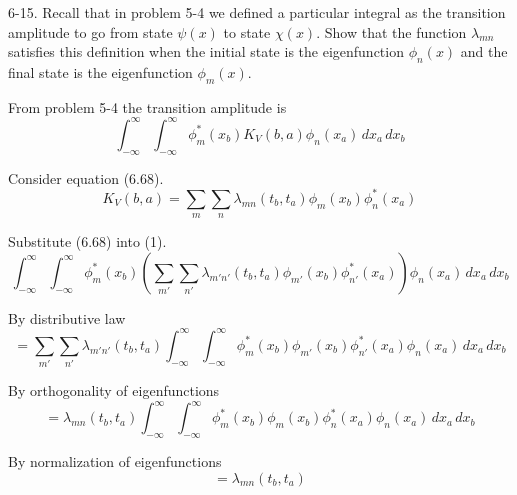 \documentclass[12pt]{article}
\begin{document}
6-15.
Recall that in problem 5-4 we defined a particular integral as the
transition amplitude to go from state $\psi(x)$ to state $\chi(x)$.
Show that the function $\lambda_{mn}$ satisfies this definition
when the initial state is the eigenfunction $\phi_n(x)$ and the
final state is the eigenfunction $\phi_m(x)$.

\bigskip
From problem 5-4 the transition amplitude is
\begin{equation*}
\int_{-\infty}^\infty\int_{-\infty}^\infty
\phi_m^*(x_b)K_V(b,a)\phi_n(x_a)
\,dx_a\,dx_b
\tag{1}
\end{equation*}

Consider equation (6.68).
\begin{equation*}
K_V(b,a)=\sum_m\sum_n\lambda_{mn}(t_b,t_a)\phi_m(x_b)\phi_n^*(x_a)
\tag{6.68}
\end{equation*}

Substitute (6.68) into (1).
\begin{equation*}
\int_{-\infty}^\infty\int_{-\infty}^\infty
\phi_m^*(x_b)
\left(\sum_{m'}\sum_{n'}\lambda_{m'n'}(t_b,t_a)\phi_{m'}(x_b)\phi_{n'}^*(x_a)\right)
\phi_n(x_a)
\,dx_a\,dx_b
\end{equation*}

By distributive law
\begin{equation*}
{}=\sum_{m'}\sum_{n'}\lambda_{m'n'}(t_b,t_a)
\int_{-\infty}^\infty\int_{-\infty}^\infty
\phi_m^*(x_b)\phi_{m'}(x_b)
\phi_{n'}^*(x_a)\phi_n(x_a)
\,dx_a\,dx_b
\end{equation*}

By orthogonality of eigenfunctions
\begin{equation*}
{}=\lambda_{mn}(t_b,t_a)\int_{-\infty}^\infty\int_{-\infty}^\infty
\phi_m^*(x_b)\phi_m(x_b)
\phi_n^*(x_a)\phi_n(x_a)
\,dx_a\,dx_b
\end{equation*}

By normalization of eigenfunctions
\begin{equation*}
{}=\lambda_{mn}(t_b,t_a)
\end{equation*}
\end{document}

